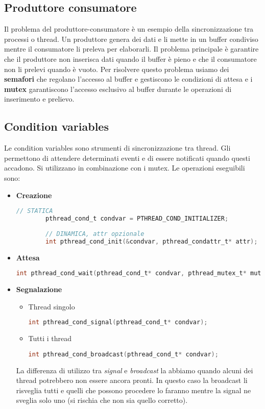 \subsection{Produttore consumatore}
Il problema del produttore-consumatore è un esempio della sincronizzazione tra processi o thread. Un produttore genera dei dati e li mette in un buffer condiviso mentre il consumatore li preleva per elaborarli. Il problema principale è garantire che il produttore non inserisca dati quando il buffer è pieno e che il consumatore non li prelevi quando è vuoto. Per risolvere questo problema usiamo dei \textbf{semafori} che regolano l'accesso al buffer e gestiscono le condizioni di attesa e i \textbf{mutex} garantiscono l'accesso esclusivo al buffer durante le operazioni di inserimento e prelievo.

\newpage
\subsection{Condition variables}
Le condition variables sono strumenti di sincronizzazione tra thread. Gli permettono di attendere determinati eventi e di essere notificati quando questi accadono. Si utilizzano in combinazione con i mutex. Le operazioni eseguibili sono:
\begin{itemize}
	\item \textbf{Creazione}
	\begin{lstlisting}[language=C]
		// STATICA
		pthread_cond_t condvar = PTHREAD_COND_INITIALIZER;
		
		// DINAMICA, attr opzionale
		int pthread_cond_init(&condvar, pthread_condattr_t* attr);
	\end{lstlisting}
	\item \textbf{Attesa}
	\begin{lstlisting}[language=C]
		int pthread_cond_wait(pthread_cond_t* condvar, pthread_mutex_t* mutex);
	\end{lstlisting}
	\item \textbf{Segnalazione}
	\begin{itemize}
		\item Thread singolo
		\begin{lstlisting}[language=C]
			int pthread_cond_signal(pthread_cond_t* condvar);
		\end{lstlisting}
		\item Tutti i thread
		\begin{lstlisting}[language=C]
			int pthread_cond_broadcast(pthread_cond_t* condvar);
		\end{lstlisting}
	\end{itemize}
	\begin{note}
		La differenza di utilizzo tra \textit{signal} e \textit{broadcast} la abbiamo quando alcuni dei thread potrebbero non essere ancora pronti. In questo caso la broadcast li risveglia tutti e quelli che possono procedere lo faranno mentre la signal ne sveglia solo uno (si rischia che non sia quello corretto).
	\end{note}
\end{itemize}
